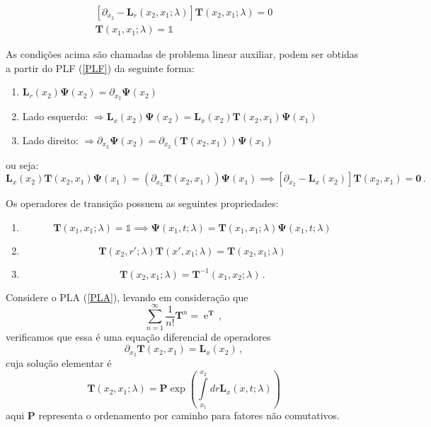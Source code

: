 \documentclass[25pt]{article}
\numberwithin{equation}{subsection} %
\DeclareMathOperator{\e}{e}
\newcommand{\OP}[1]{\mathbf{#1}}
\newcommand{\Pd}[1]{\partial_{#1}}
\begin{document}
\begin{align}\label{PLA}
\left[\Pd{x_2}-\OP{L}_r(x_2,x_1;\lambda)\right]\OP{T}(x_2,x_1;\lambda)=0\\ \OP{T}(x_1,x_1;\lambda)=\mathbb{1}\nonumber
\end{align}

As condições acima são chamadas de problema linear auxiliar, podem ser obtidas a partir do PLF (\ref{PLF}) da seguinte forma:
\begin{enumerate}
\item $\OP{L}_r(x_2)\bm{\Psi}(x_2)=\Pd{x_2}\bm{\Psi}(x_2)$
\item Lado esquerdo: $\Rightarrow \OP{L}_{x}(x_2)\bm{\Psi}(x_2)=\OP{L}_{x}(x_2)\OP{T}(x_2,x_1)\bm{\Psi}(x_1)$
\item Lado direito: $\Rightarrow \Pd{x_2}\bm{\Psi}(x_2)
=\Pd{x_2}\left(\OP{T}(x_2,x_1)\right)\bm{\Psi}(x_1)$
\end{enumerate}
ou seja:
\begin{displaymath}
\OP{L}_{x}(x_2)\OP{T}(x_2,x_1)\bm{\Psi}(x_1)=\left(\Pd{x_2}\OP{T}(x_2,x_1)\right)\bm{\Psi}(x_1)\implies \left[\Pd{x_2}-\OP{L}_{x}(x_2)\right]\OP{T}(x_2,x_1)=\OP{0}\,.
\end{displaymath}

Os operadores de transição possuem as seguintes propriedades:
\begin{enumerate}
\item \begin{equation}
\OP{T}(x_1,x_1;\lambda)=\mathbb{1}\implies \bm{\Psi}(x_1,t;\lambda)=\OP{T}(x_1,x_1;\lambda)\bm{\Psi}(x_1,t;\lambda)
\end{equation}
\item \begin{equation}
\OP{T}(x_2,r';\lambda)\OP{T}(x',x_1;\lambda)=\OP{T}(x_2,x_1;\lambda)
\end{equation}
\item \begin{equation}
\OP{T}(x_2,x_1;\lambda)=\OP{T}^{-1}(x_1,x_2;\lambda)\,.
\end{equation}
\end{enumerate}

Considere o PLA (\ref{PLA}), levando em consideração que
\begin{displaymath}
\sum_{n=1}^{\infty}\frac{1}{n!}\OP{T}^{n}=\e^{\OP{T}}\,,
\end{displaymath}
verificamos que essa é uma equação diferencial de operadores
\begin{displaymath}
\Pd{x_2}\OP{T}(x_2,x_1)=\OP{L}_{x}(x_2)\,,
\end{displaymath}
cuja solução elementar é
\begin{equation}
\OP{T}(x_2,x_1;\lambda)=\OP{P}\exp\left(\int\limits_{x_1}^{x_2}dr\OP{L}_{x}(x,t;\lambda)\right)
\end{equation}
\color{red} aqui $\OP{P}$ representa o ordenamento por caminho para fatores não comutativos.\color{black}
\end{document}
